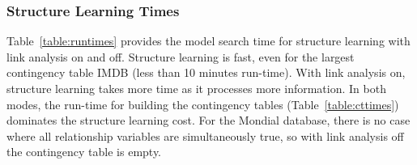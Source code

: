 \documentclass{sig-alternate-2013}
\begin{document}
\subsubsection{Structure Learning Times} 
Table~\ref{table:runtimes} provides the model search time for structure learning with link analysis on and off. Structure learning is fast, even for the largest contingency table  IMDB (less than 10 minutes run-time). With link analysis on, structure learning takes more time as it processes more information. 
In both modes, the run-time for building the contingency tables (Table~\ref{table:cttimes}) dominates the structure learning cost. For the Mondial database, there is no case where all relationship variables are simultaneously true, so with link analysis off the contingency table is empty.
\end{document}
